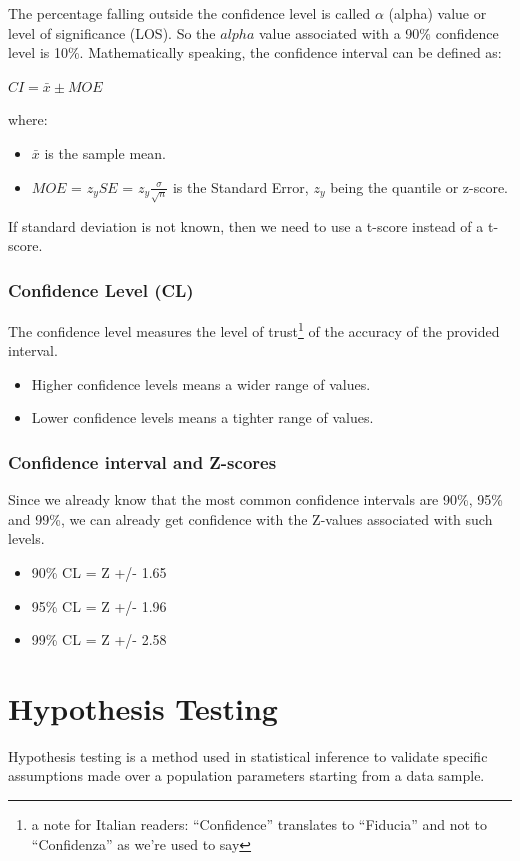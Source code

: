 \documentclass{article}
\begin{document}
The percentage falling outside the confidence level is called $\alpha$ (alpha) value or level of significance (LOS). So the $alpha$ value associated with a 90\% confidence level is 10\%. 
Mathematically speaking, the confidence interval can be defined as:

$CI = \bar{x} \pm MOE$

where:
\begin{itemize}
    \item $\bar{x}$ is the sample mean.
    \item $MOE$ = $z_y SE$ = $z_y \frac{\sigma}{\sqrt{n}}$ is the Standard Error, $z_y$ being the quantile or z-score.
\end{itemize}

If standard deviation is not known, then we need to use a t-score instead of a t-score.

\subsubsection{Confidence Level (CL)}
The confidence level measures the level of trust\footnote{a note for Italian readers: “Confidence” translates to “Fiducia” and not to “Confidenza” as we’re used to say} of the accuracy of the provided interval. 

\begin{itemize}
    \item Higher confidence levels means a wider range of values.
    \item Lower confidence levels means a tighter range of values.
\end{itemize}

\subsubsection{Confidence interval and Z-scores}
Since we already know that the most common confidence intervals are 90\%, 95\% and 99\%, we can already get confidence with the Z-values associated with such levels.
\begin{itemize}
    \item 90\% CL = Z +/- 1.65
    \item 95\% CL = Z +/- 1.96
    \item 99\% CL = Z +/- 2.58
\end{itemize}

\clearpage

\section{Hypothesis Testing}
Hypothesis testing is a method used in statistical inference to validate specific assumptions made over a population parameters starting from a data sample. 
\end{document}
